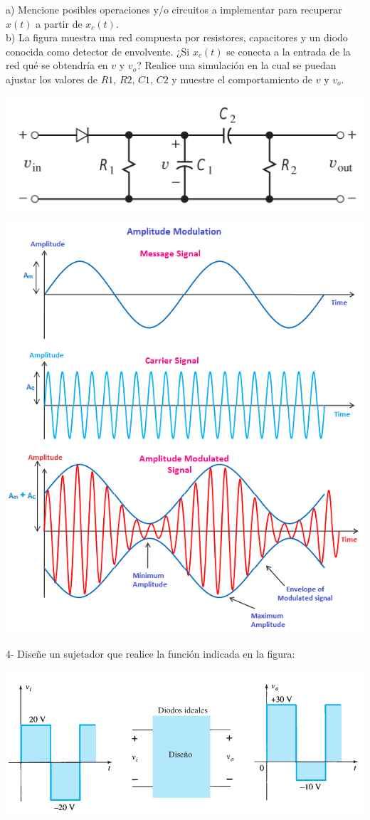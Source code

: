 \documentclass[10pt,letterpaper]{article}
\begin{document}
\begin{minipage}{8cm}
a) Mencione posibles operaciones y/o circuitos a implementar para recuperar $x(t)$ a partir de $x_c(t)$.\\

b) La figura muestra una red compuesta por resistores, capacitores y un diodo conocida como detector de envolvente. ¿Si $x_c(t)$ se conecta a la entrada de la red qué se obtendría en $v$ y $v_o$? Realice una simulación en la cual se puedan ajustar los valores de $R1$, $R2$, $C1$, $C2$ y muestre el comportamiento de $v$ y $v_o$.

\includegraphics[scale=0.22]{c3.png}
\end{minipage}
\begin{minipage}{8cm}
\includegraphics[scale=0.45]{c3_guide.png}
\end{minipage}

4- Diseñe un sujetador que realice la función indicada en la figura:

\includegraphics[scale=0.5]{c4.png}
\end{document}
